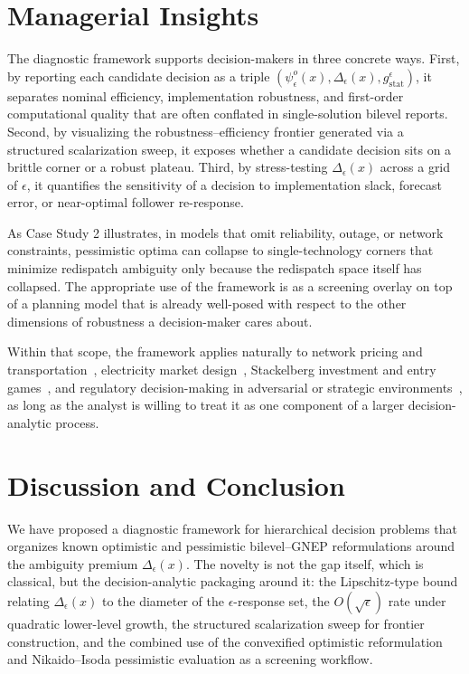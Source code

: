 \documentclass[11pt]{article}
\theoremstyle{definition}
\newcommand{\eps}{\epsilon}
\begin{document}
\section{Managerial Insights}
\label{sec:managerial}
The diagnostic framework supports decision-makers in three
concrete ways. First, by reporting each candidate decision as a
triple $(\psi_\eps^o(x),\Delta_\eps(x),g_\mathrm{stat}^\eps)$, it
separates nominal efficiency, implementation robustness, and
first-order computational quality that are often conflated in
single-solution bilevel reports. Second, by visualizing the
robustness--efficiency frontier generated via a structured
scalarization sweep, it exposes whether a candidate decision
sits on a brittle corner or a robust plateau. Third, by
stress-testing $\Delta_\eps(x)$ across a grid of $\eps$, it
quantifies the sensitivity of a decision to implementation
slack, forecast error, or near-optimal follower re-response.

As Case Study 2 illustrates, in
models that omit reliability, outage, or network constraints,
pessimistic optima can collapse to single-technology corners
that minimize redispatch ambiguity only because the redispatch
space itself has collapsed. The appropriate use of the framework
is as a screening overlay on top of a planning model that is
already well-posed with respect to the other dimensions of
robustness a decision-maker cares about.

Within that scope, the framework applies naturally to network
pricing and transportation~\cite{labbe1998bilevel,brotcorne2001bilevel,
gilbert2015numerical}, electricity market
design~\cite{daxhelet2007eu,hobbs2007nash,gabriel2012complementarity,wogrin2020applications}, Stackelberg
investment and entry games~\cite{moiseeva2014exercise}, and regulatory
decision-making in adversarial or strategic
environments~\cite{smith2020survey,caprara2016bilevel,lozano2017value}, as long as the analyst is willing to
treat it as one component of a larger decision-analytic
process.

\section{Discussion and Conclusion}
\label{sec:conclusion}
We have proposed a diagnostic framework for hierarchical
decision problems that organizes known optimistic and pessimistic
bilevel--GNEP reformulations around the ambiguity premium
$\Delta_\eps(x)$. The novelty is not the gap itself, which is
classical, but the decision-analytic packaging around it: the
Lipschitz-type bound relating $\Delta_\eps(x)$ to the diameter of
the $\eps$-response set, the $O(\sqrt\eps)$ rate under quadratic
lower-level growth, the structured scalarization sweep for
frontier construction, and the combined use of the convexified
optimistic reformulation and Nikaido--Isoda pessimistic
evaluation as a screening workflow.
\end{document}
